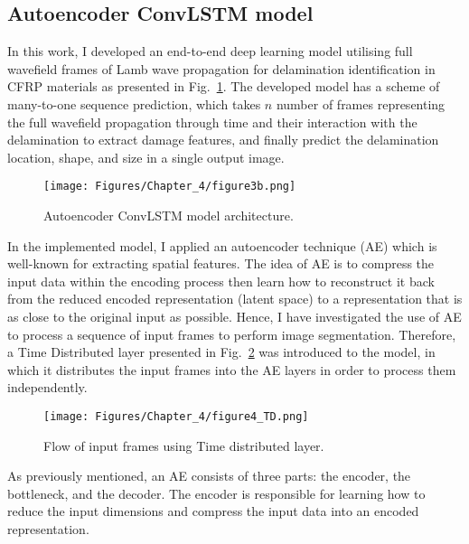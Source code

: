\subsection{Autoencoder ConvLSTM model}
\label{proposed_approach}
In this work, I developed an end-to-end deep learning model utilising full wavefield frames of Lamb wave propagation for delamination identification in CFRP materials as presented in Fig.~\ref{fig:proposed_convLSTM_model}.
The developed model has a scheme of many-to-one sequence prediction, which takes \(n\) number of frames representing the full wavefield propagation through time and their interaction with the delamination to extract damage features, and finally predict the delamination location, shape, and size in a single output image.
\begin{figure} [!h]
	\centering
	\texttt{[image: Figures/Chapter\_4/figure3b.png]}
	\caption{Autoencoder ConvLSTM model architecture.}
	\label{fig:proposed_convLSTM_model}
\end{figure} 

In the implemented model, I applied an autoencoder technique (AE) which is well-known for extracting spatial features.
The idea of AE is to compress the input data within the encoding process then learn how to reconstruct it back from the reduced encoded representation (latent space) to a representation that is as close to the original input as possible. 
Hence, I have investigated the use of AE to process a sequence of input frames to perform image segmentation.
Therefore, a Time Distributed layer presented in Fig.~\ref{fig:TD} was introduced to the model, in which it distributes the input frames into the AE layers in order to process them independently.
\begin{figure}[!h]
	\centering
	\texttt{[image: Figures/Chapter\_4/figure4\_TD.png]}
	\caption{Flow of input frames using Time distributed layer.}
	\label{fig:TD}
\end{figure}

As previously mentioned, an AE consists of three parts: the encoder, the bottleneck, and the decoder.
The encoder is responsible for learning how to reduce the input dimensions and compress the input data into an encoded representation.

